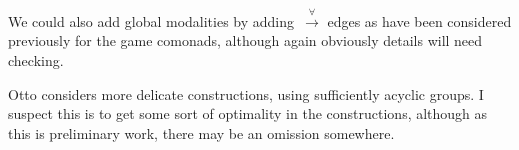 \documentclass{article}
\theoremstyle{plain}
\theoremstyle{definition}
\theoremstyle{remark}
\numberwithin{theorem}{section}
\begin{document}
We could also add global modalities by adding~$\xrightarrow{\forall}$ edges as have been considered previously for the game comonads, although again obviously details will need checking.

Otto considers more delicate constructions, using sufficiently acyclic groups. I suspect this is to get some sort of optimality in the constructions, although as this is preliminary work, there may be an omission somewhere.



\end{document}
